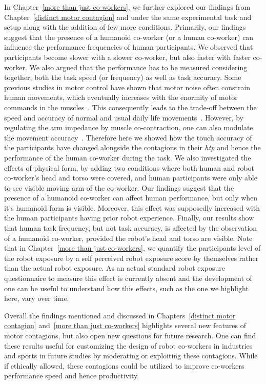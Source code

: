 In Chapter~\ref{more than just co-workers}, we further explored our findings from Chapter~\ref{distinct motor contagion} and under the same experimental task and setup along with the addition of few more conditions. Primarily, our findings suggest that the presence of a humanoid co-worker (or a human co-worker) can influence the performance frequencies of human participants. We observed that participants become slower with a slower co-worker, but also faster with faster co-worker. We also argued that the performance has to be measured considering together, both the task speed (or frequency) as well as task accuracy. Some previous studies in motor control have shown that motor noise often constrain human movements, which eventually increases with the enormity of motor commands in the muscles~\cite{Harris:Nature:1998}. This consequently leads to the trade-off between the speed and accuracy of normal and usual daily life movements~\cite{Fitts:JEP:1954}. However, by regulating the arm impedance by muscle co-contraction, one can also modulate the movement accuracy~\cite{Burdet:nature:2001, Franklin:JoN:2008, Ganesh:RAS:2013}. Therefore here we showed how the touch accuracy of the participants have changed alongside the contagions in their {\it htp} and hence the performance of the human co-worker during the task. We also investigated the effects of physical form, by adding two conditions where both human and robot co-worker's head and torso were covered, and human participants were only able to see visible moving arm of the co-worker. Our findings suggest that the presence of a humanoid co-worker can affect human performance, but only when it's humanoid form is visible. Moreover, this effect was supposedly increased with the human participants having prior robot experience. Finally, our results show that human task frequency, but not task accuracy, is affected by the observation of a humanoid co-worker, provided the robot's head and torso are visible. Note that in Chapter~\ref{more than just co-workers}, we quantify the participants level of the robot exposure by a self perceived robot exposure score by themselves rather than the actual robot exposure. As an actual standard robot exposure questionnaire to measure this effect is currently absent and the development of one can be useful to understand how this effects, such as the one we highlight here, vary over time.

Overall the findings mentioned and discussed in Chapters~\ref{distinct motor contagion} and~\ref{more than just co-workers} highlights several new features of motor contagions, but also open new questions for future research. One can find these results useful for customizing the design of robot co-workers in industries and sports in future studies by moderating or exploiting these contagions. While if ethically allowed, these contagions could be utilized to improve co-workers performance speed and hence productivity.




